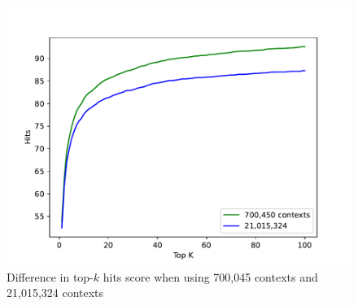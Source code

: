 \documentclass[12pt, sort&compress]{report}
\begin{document}
\begin{figure}
	\centering
	\includegraphics[scale=0.7]{images/PDF/experiments/700Kvs21M.pdf}
	\caption {Difference in top-$k$ hits score when using 700,045 contexts and 21,015,324 contexts}
	\label{fig:18}
\end{figure}
\end{document}

